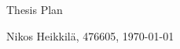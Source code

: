 \documentclass[12pt,a4paper,english,oneside]{article}
\begin{document}
\begin{titlepage}
    \begin{center}
        
        {\huge Thesis Plan}
        \vspace*{0.5cm}

        \large
        Nikos Heikkilä,
        476605,
        \today
    \end{center}
 \end{titlepage}

\end{document}
